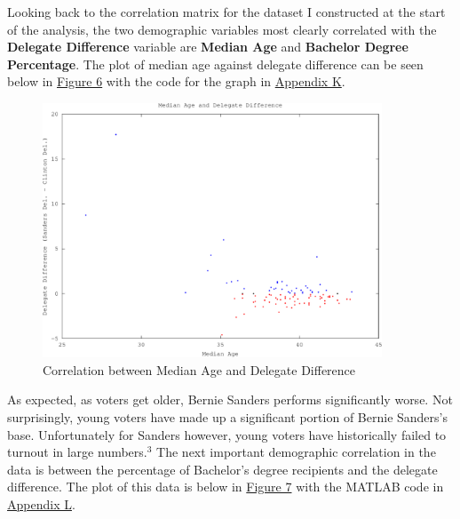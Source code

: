 \documentclass[11pt]{article}
\begin{document}
\begin{multicols}{2}
Looking back to the correlation matrix for the dataset I constructed at the start of the analysis, the two demographic variables most clearly correlated with the \textbf{Delegate Difference} variable are \textbf{Median Age} and \textbf{Bachelor Degree Percentage}. The plot of median age against delegate difference can be seen below in \underline{Figure 6} with the code for the graph in \underline{Appendix K}.

\end{multicols}

\begin{figure}[H]
    \caption{Correlation between Median Age and Delegate Difference}
    \centering
    \includegraphics[width=0.9\textwidth]{iowa-corr-age-crop}
\end{figure}

\begin{multicols}{2}

As expected, as voters get older, Bernie Sanders performs significantly worse. Not surprisingly, young voters have made up a significant portion of Bernie Sanders's base. Unfortunately for Sanders however, young voters have historically failed to turnout in large numbers.$^3$ The next important demographic correlation in the data is between the percentage of Bachelor's degree recipients and the delegate difference. The plot of this data is below in \underline{Figure 7} with the MATLAB code in \underline{Appendix L}.

\end{multicols}
\end{document}
